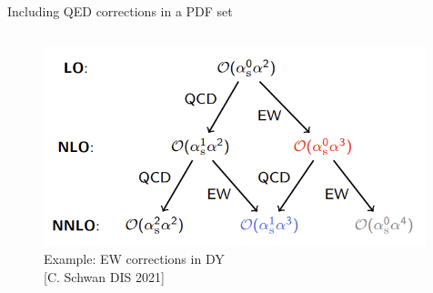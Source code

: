 \documentclass[aspectratio=169, 8pt,t]{beamer}
\begin{document}
\begin{frame}{Including QED corrections in a PDF set}
\begin{columns}
    \begin{column}{0.49\textwidth}
      \begin{figure}
        \includegraphics[width=0.99\textwidth]{figures/ewcorrections_dy.png}
        \caption*{Example: EW corrections in DY\\ {\color{gray}\small [C. Schwan DIS 2021]}}
      \end{figure}
    \end{column}
  \end{columns}
\end{frame}
\end{document}
